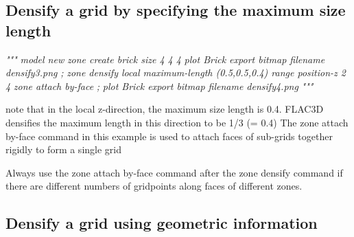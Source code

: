 \documentclass[a4paper, nobind]{templates/ociamthesis}
\newenvironment{Shaded}{\begin{snugshade}}{\end{snugshade}}
\newcommand{\CommentTok}[1]{\textcolor[rgb]{0.56,0.35,0.01}{\textit{#1}}}
\renewenvironment{Shaded}
{
  \vspace{10pt}%
  \begin{snugshade}%
}{%
  \end{snugshade}%
  \vspace{8pt}%
}
\begin{document}
\hypertarget{densify-a-grid-by-specifying-the-maximum-size-length}{%
\subsection{Densify a grid by specifying the maximum size length}\label{densify-a-grid-by-specifying-the-maximum-size-length}}

\begin{Shaded}
\begin{Highlighting}[]
\CommentTok{"""}
\CommentTok{model new}
\CommentTok{zone create brick size 4 4 4}
\CommentTok{plot \textquotesingle{}Brick\textquotesingle{} export bitmap filename \textquotesingle{}densify3.png\textquotesingle{}}
\CommentTok{;}
\CommentTok{zone densify local maximum{-}length (0.5,0.5,0.4) range position{-}z 2 4}
\CommentTok{zone attach by{-}face}
\CommentTok{;}
\CommentTok{plot \textquotesingle{}Brick\textquotesingle{} export bitmap filename \textquotesingle{}densify4.png\textquotesingle{}}
\CommentTok{"""}
\end{Highlighting}
\end{Shaded}

note that in the local z-direction, the maximum size length is 0.4. FLAC3D densifies the maximum length in this direction to be 1/3 (= 0.4)
The zone attach by-face command in this example is used to attach faces of sub-grids together rigidly to form a single grid

Always use the zone attach by-face command after the zone densify command if there are different numbers of gridpoints along faces of different zones.

\hypertarget{densify-a-grid-using-geometric-information}{%
\subsection{Densify a grid using geometric information}\label{densify-a-grid-using-geometric-information}}
\end{document}
